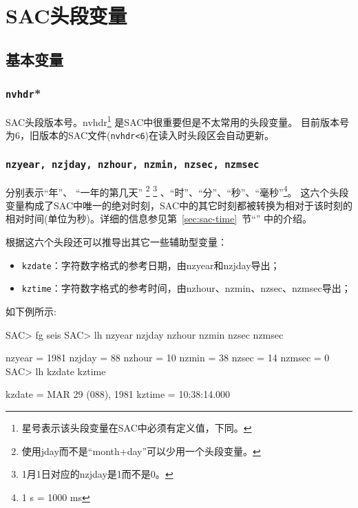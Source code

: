 \section{SAC头段变量}
\label{sec:sac-header-variables}

\subsection{基本变量}

\subsubsection{\texttt{nvhdr}*}
SAC头段版本号。nvhdr\footnote{星号表示该头段变量在SAC中必须有定义值，下同。}
是SAC中很重要但是不太常用的头段变量。
目前版本号为6，旧版本的SAC文件(\texttt{nvhdr<6})在读入时头段区会自动更新。

\subsubsection{\texttt{nzyear, nzjday, nzhour, nzmin, nzsec, nzmsec}}
分别表示``年''、
``一年的第几天''
\footnote{使用jday而不是``month+day''可以少用一个头段变量。}
\footnote{1月1日对应的nzjday是1而不是0。}
、``时''、``分''、``秒''、``毫秒''\footnote{1 s = 1000 ms}。
这六个头段变量构成了SAC中唯一的绝对时刻，SAC中的其它时刻都被转换为相对于该时刻的
相对时间(单位为秒)。详细的信息参见第~\ref{sec:sac-time}~节``''
中的介绍。

根据这六个头段还可以推导出其它一些辅助型变量：
\begin{itemize}
\item \texttt{kzdate}：字符数字格式的参考日期，由nzyear和nzjday导出；
\item \texttt{kztime}：字符数字格式的参考时间，由nzhour、nzmin、nzsec、nzmsec导出；
\end{itemize}

如下例所示:
\begin{SACCode}
SAC> fg seis
SAC> lh nzyear nzjday nzhour nzmin nzsec nzmsec

     nzyear = 1981
     nzjday = 88
     nzhour = 10
      nzmin = 38
      nzsec = 14
     nzmsec = 0
SAC> lh kzdate kztime

     kzdate = MAR 29 (088), 1981
     kztime = 10:38:14.000
\end{SACCode}

